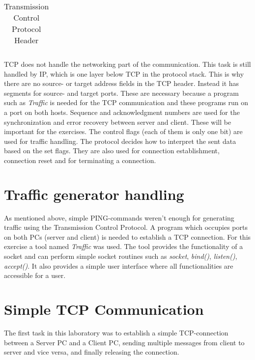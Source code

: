 \begin{table}[H]
\begin{tabular}{|c|c|c|c|c|c|c|c|c|c|c|c|c|}
	\end{tabular}
	\caption{Transmission Control Protocol Header}
\end{table}

TCP does not handle the networking part of the communication. This task is still handled by IP, which is one layer below TCP in the protocol stack. This is why there are no source- or target address fields in the TCP header. Instead it has segments for source- and target ports. These are necessary because a program such as \textit{Traffic} is needed for the TCP communication and these programs run on a port on both hosts. Sequence and acknowledgment numbers are used for the synchronization and error recovery between server and client. These will be important for the exercises. The control flags (each of them is only one bit) are used for traffic handling. The protocol decides how to interpret the sent data based on the set flags. They are also used for connection establishment, connection reset and for terminating a connection.

\section{Traffic generator handling}
As mentioned above, simple PING-commands weren't enough for generating traffic using the Transmission Control Protocol. A program which occupies ports on both PCs (server and client) is needed to establish a TCP connection. For this exercise a tool named \textit{Traffic} was used. The tool provides the functionality of a socket and can perform simple socket routines such as \textit{socket}, \textit{bind()}, \textit{listen()}, \textit{accept()}. It also provides a simple user interface where all functionalities are accessible for a user.

\section{Simple TCP Communication}
The first task in this laboratory was to establish a simple TCP-connection between a Server PC and a Client PC, sending multiple messages from client to server and vice versa, and finally releasing the connection.

